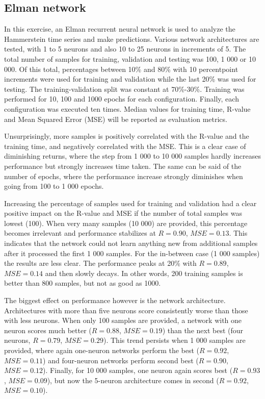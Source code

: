 \documentclass[a4, 10pt, twoside, twocolumn]{article}
\numberwithin{figure}{section}
\begin{document}
\subsection{Elman network}

In this exercise, an Elman recurrent neural network is used to analyze the Hammerstein time series and make predictions. Various network architectures are tested, with 1 to 5 neurons and also 10 to 25 neurons in increments of 5. The total number of samples for training, validation and testing was 100, 1 000 or 10 000. Of this total, percentages between 10\% and 80\% with 10 percentpoint increments were used for training and validation while the last 20\% was used for testing. The training-validation split was constant at 70\%-30\%. Training was performed for 10, 100 and 1000 epochs for each configuration. Finally, each configuration was executed ten times. Median values for training time, R-value and Mean Squared Error (MSE) will be reported as evaluation metrics.

Unsurprisingly, more samples is positively correlated with the R-value and the training time, and negatively correlated with the MSE. This is a clear case of diminishing returns, where the step from 1 000 to 10 000 samples hardly increases performance but strongly increases time taken. The same can be said of the number of epochs, where the performance increase strongly diminishes when going from 100 to 1 000 epochs.

Increasing the percentage of samples used for training and validation had a clear positive impact on the R-value and MSE if the number of total samples was lowest (100). When very many samples (10 000) are provided, this percentage becomes irrelevant and performance stabilizes at $R=0.90$, $MSE=0.13$. This indicates that the network could not learn anything new from additional samples after it processed the first 1 000 samples. For the in-between case (1 000 samples) the results are less clear. The performance peaks at 20\% with $R=0.89$, $MSE = 0.14$ and then slowly decays. In other words, 200 training samples is better than 800 samples, but not as good as 1000.

The biggest effect on performance however is the network architecture. Architectures with more than five neurons score consistently worse than those with less neurons. When only 100 samples are provided, a network with one neuron scores much better ($R=0.88$, $MSE=0.19$) than the next best (four neurons, $R=0.79$, $MSE=0.29$). This trend persists when 1 000 samples are provided, where again one-neuron networks perform the best ($R=0.92$, $MSE=0.11$) and four-neuron networks perform second best ($R=0.90$, $MSE=0.12$). Finally, for 10 000 samples, one neuron again scores best ($R=0.93$, $MSE=0.09$), but now the 5-neuron architecture comes in second ($R=0.92$, $MSE=0.10$).
\end{document}
